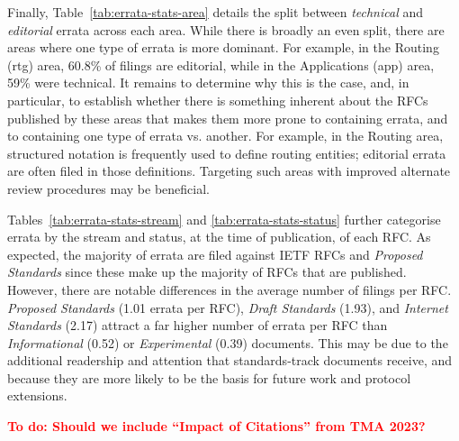 \documentclass[twocolumn,10pt]{article}
\newcommand{\todo}[1]{\textbf{\textcolor{red}{To do: #1}}}
\begin{document}
Finally, Table~\ref{tab:errata-stats-area} details the split between
\emph{technical} and \emph{editorial} errata across each area. While there
is broadly an even split, there are areas where one type of errata is more
dominant. For example, in the Routing (rtg) area, 60.8\% of filings are
editorial, while in the Applications (app) area, 59\% were technical.  It
remains to determine why this is the case, and, in particular, to establish
whether there is something inherent about the RFCs published by these areas
that makes them more prone to containing errata, and to containing one type
of errata vs. another. For example, in the Routing area, structured
notation is frequently used to define routing entities; editorial errata
are often filed in those definitions. Targeting such areas with improved
alternate review procedures may be beneficial.

Tables~\ref{tab:errata-stats-stream} and \ref{tab:errata-stats-status}
further categorise errata by the stream and status, at the time of
publication, of each RFC. As expected, the majority of errata are filed
against IETF RFCs and \emph{Proposed Standards} since these make up the
majority of RFCs that are published. However, there are notable differences
in the average number of filings per RFC. \emph{Proposed Standards} (1.01
errata per RFC), \emph{Draft Standards} (1.93), and \emph{Internet
Standards} (2.17) attract a far higher number of errata per RFC than
\emph{Informational} (0.52) or \emph{Experimental} (0.39) documents. This
may be due to the additional readership and attention that standards-track
documents receive, and because they are more likely to be the basis for
future work and protocol extensions.




\todo{Should we include ``Impact of Citations'' from TMA 2023?}
\end{document}
